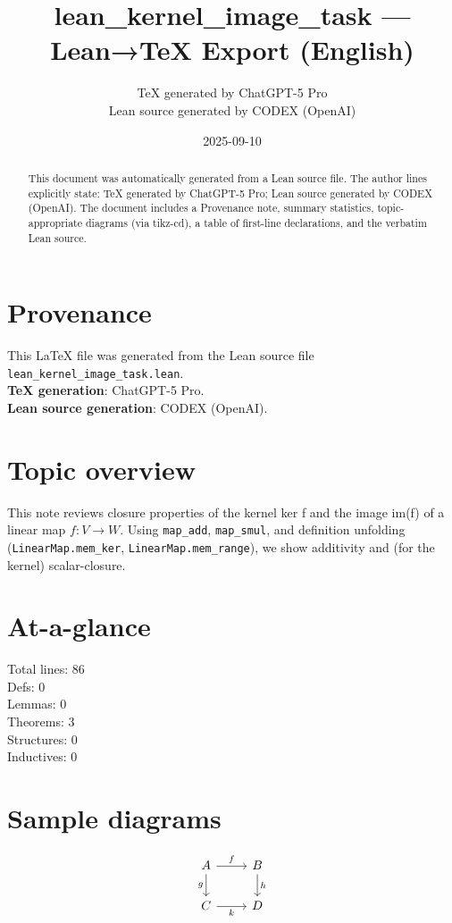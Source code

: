 \documentclass[12pt]{article}
\title{lean\_kernel\_image\_task — Lean→TeX Export (English)}
\author{TeX generated by ChatGPT-5 Pro\\Lean source generated by CODEX (OpenAI)}
\date{2025-09-10}
\begin{document}
\maketitle

\begin{abstract}
This document was automatically generated from a Lean source file. The author lines explicitly state: TeX generated by ChatGPT-5 Pro; Lean source generated by CODEX (OpenAI). The document includes a Provenance note, summary statistics, topic-appropriate diagrams (via tikz-cd), a table of first-line declarations, and the verbatim Lean source.
\end{abstract}

\section*{Provenance}
This \LaTeX{} file was generated from the Lean source file \texttt{lean\_kernel\_image\_task.lean}.\\
\textbf{TeX generation}: ChatGPT-5 Pro.\\
\textbf{Lean source generation}: CODEX (OpenAI).

\section*{Topic overview}
This note reviews closure properties of the kernel ker f and the image im(f) of a linear map $f: V \rightarrow W$. Using \texttt{map_add}, \texttt{map_smul}, and definition unfolding (\texttt{LinearMap.mem_ker}, \texttt{LinearMap.mem_range}), we show additivity and (for the kernel) scalar-closure.

\section*{At-a-glance}
Total lines: 86\\
Defs: 0\\
Lemmas: 0\\
Theorems: 3\\
Structures: 0\\
Inductives: 0

\section*{Sample diagrams}

\[
\begin{tikzcd}
A \arrow[r, "f"] \arrow[d, "g"'] & B \arrow[d, "h"] \\
C \arrow[r, "k"'] & D
\end{tikzcd}
\]
\end{document}
